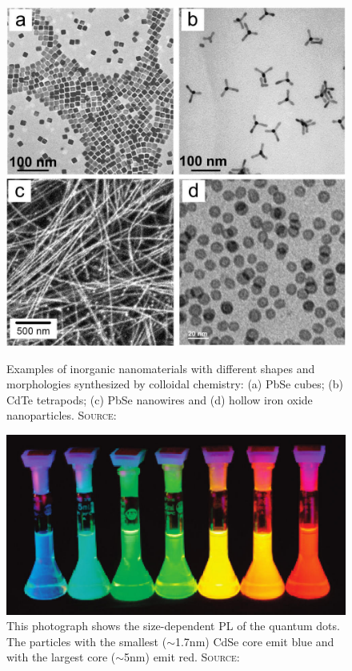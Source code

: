	\begin{figure}[htbp]
		\begin{minipage}[t]{0.49\textwidth}
			\centering
			\includegraphics[width=\textwidth]{Fig/QDshapes.jpg}
			\caption{Examples of inorganic nanomaterials with different
							 shapes and morphologies synthesized by colloidal chemistry:
							 (a) PbSe cubes; (b) CdTe tetrapods; (c) PbSe nanowires and
							 (d) hollow iron oxide nanoparticles.
							 {\scshape Source:} \cite[p.394]{Talapin}}
			\label{fig:QDshapes}
		\end{minipage}
		\hfill
		\begin{minipage}[t]{0.49\textwidth}
			\centering
			\includegraphics[width=\textwidth]{Fig/QDcolor.jpg}
			\caption{This photograph shows the size-dependent \gls{PL} of the quantum dots. The particles with the smallest ($\sim$1.7nm)
							 CdSe core emit blue and with the largest core ($\sim$5nm) emit red.
							 {\scshape Source:} \cite[p.393]{Talapin}}
			\label{fig:QDTheory}
		\end{minipage}
	\end{figure}			

